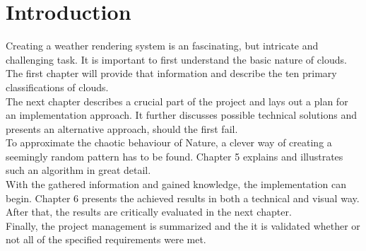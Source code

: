 \section{Introduction}
Creating a weather rendering system is an fascinating, but intricate and challenging task.
It is important to first understand the basic nature of clouds. The first chapter will provide that information and describe the ten primary classifications of clouds.
\\
The next chapter describes a crucial part of the project and lays out a plan for an implementation approach. It further discusses possible technical solutions and presents an alternative approach, should the first fail.
\\
To approximate the chaotic behaviour of Nature, a clever way of creating a seemingly random pattern has to be found.
Chapter 5 explains and illustrates such an algorithm in great detail.
\\
With the gathered information and gained knowledge, the implementation can begin. Chapter 6 presents the achieved results in both a technical and visual way.
After that, the results are critically evaluated in the next chapter.
\\
Finally, the project management is summarized and the it is validated whether or not all of the specified requirements were met.